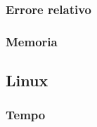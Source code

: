 \documentclass[11pt,italian]{article}
\begin{document}
\subsubsection*{Errore relativo}
\begin{figure}[H]
\end{figure}

\subsubsection*{Memoria}
\begin{figure}[H]
\end{figure}

\subsection{Linux}
\subsubsection*{Tempo}
\begin{figure}[H]
\end{figure}
\end{document}
